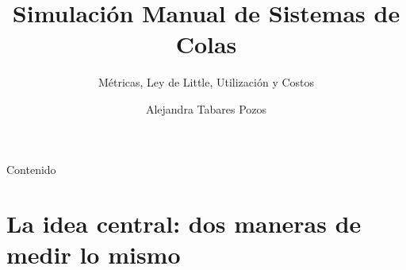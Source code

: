 \documentclass[aspectratio=1610, 9pt]{beamer}
\title[Simulacion Manual de Colas]{Simulaci\'on Manual de Sistemas de Colas}
\subtitle{M\'etricas, Ley de Little, Utilizaci\'on y Costos}
\author{Alejandra Tabares Pozos}
\institute{Universidad de los Andes \\
 Departamento de Ingeniería Industrial}
\date{}
\begin{document}
\begin{frame}
\titlepage
\end{frame}

\begin{frame}{Contenido}
\tableofcontents
\end{frame}

\section{La idea central: dos maneras de medir lo mismo}
\end{document}
